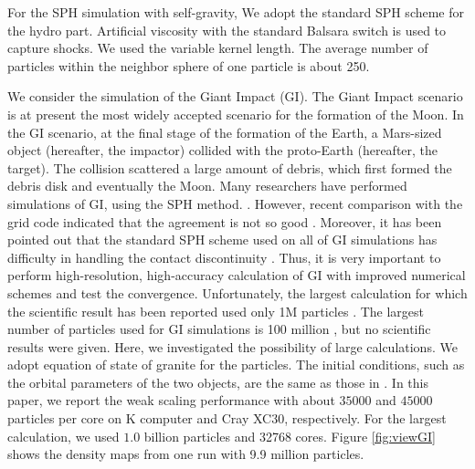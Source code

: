 \documentclass[dvipdfmx]{acm_proc_article-sp}
\begin{document}
For the SPH simulation with self-gravity, We adopt the standard SPH
scheme \cite{1992ARA&A..30..543M, 2009NewAR..53...78R,
  2010ARA&A..48..391S} for the hydro part. Artificial viscosity
\cite{1997JCoPh.136..298M} with the standard Balsara switch
\cite{1995JCoPh.121..357B} is used to capture shocks.
We used the variable kernel length. The average number of particles
within the neighbor sphere of one particle is about 250.

We consider the simulation of the Giant Impact (GI).  The Giant Impact
scenario \cite{1975Icar...24..504H, 1976LPI.....7..120C} is at present
the most widely accepted scenario for the formation of the Moon.  In
the GI scenario, at the final stage of the formation of the Earth, a
Mars-sized object (hereafter, the impactor) collided with the
proto-Earth (hereafter, the target). The collision scattered a large
amount of debris, which first formed the debris disk and eventually
the Moon. Many researchers have performed simulations of GI, using the
SPH method.  \cite{1986Icar...66..515B, 2013Icar..222..200C,
  2014NatGe...7..564A}.  However, recent comparison with the grid code
indicated that the agreement is not so good
{\cite{2006ApJ...638.1180W, 2013Icar..222..200C}}. Moreover,
it has been pointed out that the standard SPH scheme used on all of GI
simulations has difficulty in handling the contact discontinuity
{\cite{2013MNRAS.428.2840H, 2013ApJ...768...44S,
    2013PASJ...65..108H, 2014hosono}}. Thus, it is very important to
perform high-resolution, high-accuracy calculation of GI with improved
numerical schemes and test the convergence. Unfortunately, the largest
calculation for which the scientific result has been reported used
only 1M particles {\cite{2013Icar..222..200C}}.  The largest
number of particles used for GI simulations is 100 million
\cite{2014LPI....45.2703T}, but no scientific results were given.
Here, we investigated the possibility of large calculations.  We adopt
equation of state of granite \cite{1986Icar...66..515B} for the
particles. The initial conditions, such as the orbital parameters of
the two objects, are the same as those in
\cite{1986Icar...66..515B}. In this paper, we report the weak scaling
performance with about $35000$ and $45000$ particles per core on K
computer and Cray XC30, respectively. For the largest
calculation, we used $1.0$ billion particles and 32768 cores.
Figure \ref{fig:viewGI} shows the density maps from one run with 9.9
million particles. 
\end{document}
